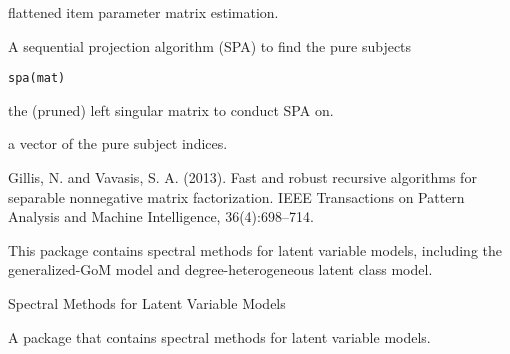 \documentclass[a4paper]{book}
\begin{document}
%
\begin{Value}
\begin{description}

\item[    flattened item parameter matrix estimation.] 
\end{description}

\end{Value}
%
\begin{Description}
A sequential projection algorithm (SPA) to find the pure subjects
\end{Description}
%
\begin{Usage}
\begin{verbatim}
spa(mat)
\end{verbatim}
\end{Usage}
%
\begin{Arguments}
\begin{ldescription}
\item[\code{mat}] the (pruned) left singular matrix to conduct SPA on.
\end{ldescription}
\end{Arguments}
%
\begin{Value}
\begin{description}

\item[    a vector of the pure subject indices.] 
\end{description}

\end{Value}
%
\begin{References}
Gillis, N. and Vavasis, S. A. (2013). Fast and robust recursive algorithms for separable nonnegative matrix factorization. IEEE Transactions on Pattern Analysis and Machine Intelligence, 36(4):698–714.
\end{References}
%
\begin{Description}
This package contains spectral methods for latent variable models, including the generalized-GoM model and degree-heterogeneous latent class model.
\end{Description}
%
\begin{Details}
Spectral Methods for Latent Variable Models

A package that contains spectral methods for latent variable models.
\end{Details}
\end{document}
